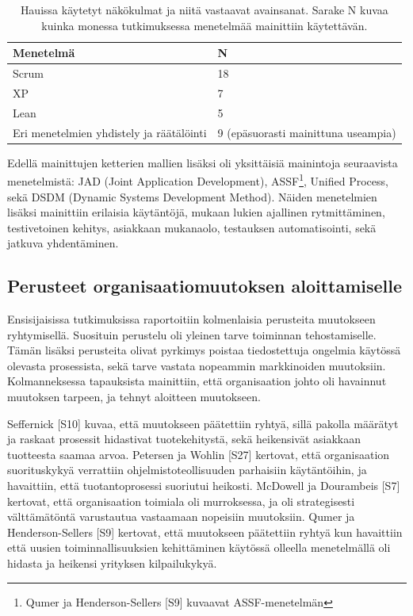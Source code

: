 \begin{table}[h]
    \begin{tabular}{ll}
        \toprule
        Menetelmä       & N   \\ \midrule
        Scrum           & 18 \\ 
        XP              & 7 \\
        Lean            & 5 \\
        Eri menetelmien yhdistely ja räätälöinti & 9  (epäsuorasti mainittuna useampia) \\
        \bottomrule
    \end{tabular}
	\caption{Hauissa käytetyt näkökulmat ja niitä vastaavat avainsanat. Sarake N
	kuvaa kuinka monessa tutkimuksessa menetelmää mainittiin käytettävän.}
	\label{table:practices}
\end{table}

Edellä mainittujen ketterien mallien lisäksi oli yksittäisiä mainintoja
seuraavista menetelmistä: JAD (Joint Application Development),
ASSF\footnote{Qumer ja Henderson-Sellers [S9] kuvaavat ASSF-menetelmän}, Unified
Process, sekä DSDM (Dynamic Systems Development Method). Näiden menetelmien
lisäksi mainittiin erilaisia käytäntöjä, mukaan lukien ajallinen rytmittäminen,
testivetoinen kehitys, asiakkaan mukanaolo, testauksen automatisointi, sekä
jatkuva yhdentäminen.

\subsection{Perusteet organisaatiomuutoksen aloittamiselle}

Ensisijaisissa tutkimuksissa raportoitiin kolmenlaisia perusteita muutokseen
ryhtymisellä. Suosituin perustelu oli yleinen tarve toiminnan tehostamiselle.
Tämän lisäksi perusteita olivat pyrkimys poistaa tiedostettuja ongelmia käytössä
olevasta prosessista, sekä tarve vastata nopeammin markkinoiden muutoksiin.
Kolmanneksessa tapauksista mainittiin, että organisaation johto oli havainnut
muutoksen tarpeen, ja tehnyt aloitteen muutokseen.

Seffernick [S10] kuvaa, että muutokseen päätettiin ryhtyä, sillä pakolla
määrätyt ja raskaat prosessit hidastivat tuotekehitystä, sekä heikensivät
asiakkaan tuotteesta saamaa arvoa. Petersen ja Wohlin [S27] kertovat, että
organisaation suorituskykyä verrattiin ohjelmistoteollisuuden parhaisiin
käytäntöihin, ja havaittiin, että tuotantoprosessi suoriutui heikosti. McDowell
ja Dourambeis [S7] kertovat, että organisaation toimiala oli murroksessa, ja
oli strategisesti välttämätöntä varustautua vastaamaan nopeisiin muutoksiin.
Qumer ja Henderson-Sellers [S9] kertovat, että muutokseen päätettiin ryhtyä kun
havaittiin että uusien toiminnallisuuksien kehittäminen käytössä olleella
menetelmällä oli hidasta ja heikensi yrityksen kilpailukykyä.

